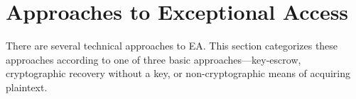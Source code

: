 


\section{Approaches to Exceptional Access}
\label{sec-tech-approaches}





There are several technical approaches to \ac{EA}. This section categorizes these approaches according to one of three
basic approaches---\ac{key-escrow}, cryptographic recovery without a key, or non-cryptographic means of acquiring
plaintext.

